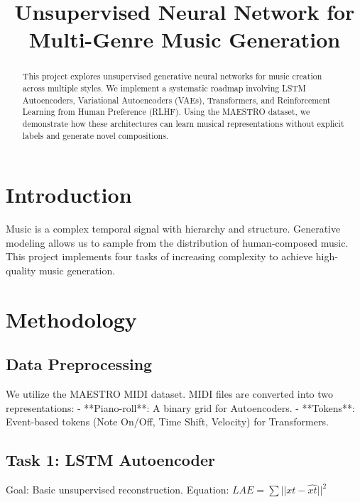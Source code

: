 \documentclass[conference]{IEEEtran}
\begin{document}
\title{Unsupervised Neural Network for Multi-Genre Music Generation}

\author{
}

\maketitle

\begin{abstract}
This project explores unsupervised generative neural networks for music creation across multiple styles. We implement a systematic roadmap involving LSTM Autoencoders, Variational Autoencoders (VAEs), Transformers, and Reinforcement Learning from Human Preference (RLHF). Using the MAESTRO dataset, we demonstrate how these architectures can learn musical representations without explicit labels and generate novel compositions.
\end{abstract}

\section{Introduction}
Music is a complex temporal signal with hierarchy and structure. Generative modeling allows us to sample from the distribution of human-composed music. This project implements four tasks of increasing complexity to achieve high-quality music generation.

\section{Methodology}
\subsection{Data Preprocessing}
We utilize the MAESTRO MIDI dataset. MIDI files are converted into two representations:
- **Piano-roll**: A binary grid for Autoencoders.
- **Tokens**: Event-based tokens (Note On/Off, Time Shift, Velocity) for Transformers.

\subsection{Task 1: LSTM Autoencoder}
Goal: Basic unsupervised reconstruction.
Equation: $LAE = \sum ||xt - \hat{xt}||^2$
\end{document}
